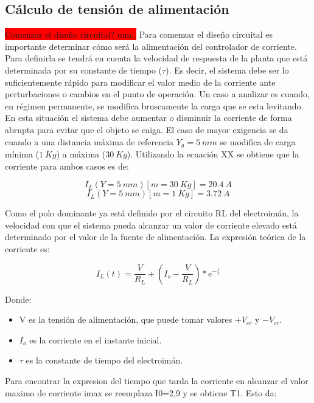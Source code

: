 \subsection{Cálculo de tensión de alimentación}
\colorbox{red}{Comenzar el diseño circuital? mm..}
Para comenzar el diseño circuital es importante determinar cómo será la alimentación del controlador de corriente. Para definirla se tendrá en cuenta la velocidad de respuesta de la planta que está determinada por su constante de tiempo ($\tau$). Es decir, el sistema debe ser lo suficientemente rápido para modificar el valor medio de la corriente ante perturbaciones o cambios en el punto de operación. Un caso a analizar es cuando, en régimen permanente, se modifica bruscamente la carga que se esta levitando. En esta situación el sistema debe aumentar o disminuir la corriente de forma abrupta para evitar que el objeto se caiga. El caso de mayor exigencia se da cuando a una distancia máxima de referencia $Y_g=5\:mm$ se modifica de carga mínima ($1\:Kg$) a máxima ($30\:Kg$). Utilizando la ecuación XX se obtiene que la corriente para ambos casos es de:

\begin{equation}
	I_L(Y=5\:mm)[m=30\:Kg]=20.4\:A 
\end{equation}
\begin{equation}
	I_L(Y=5\:mm)[m=1\:Kg]=3.72\:A
\end{equation}

Como el polo dominante ya está definido por el circuito RL del electroimán, la velocidad con que el sistema pueda alcanzar un valor de corriente elevado está determinado por el valor de la fuente de alimentación. La expresión teórica de la corriente es: 

\begin{equation}
	I_L(t)=\frac{V}{R_L} + (I_o-\frac{V}{R_L})*e^{-\frac{t}{\tau}}
\end{equation}

Donde:
\begin{itemize}
	\item V es la tensión de alimentación, que puede tomar valores $+V_{cc}$ y $-V_{cc}$.
	\item $I_o$ es la corriente en el instante inicial.
	\item $\tau$ es la constante de tiempo del electroimán.
\end{itemize}

Para encontrar la expresion del tiempo que tarda la corriente en alcanzar el valor maximo de corriente imax se reemplaza I0=2,9 y se obtiene T1. Esto da:

